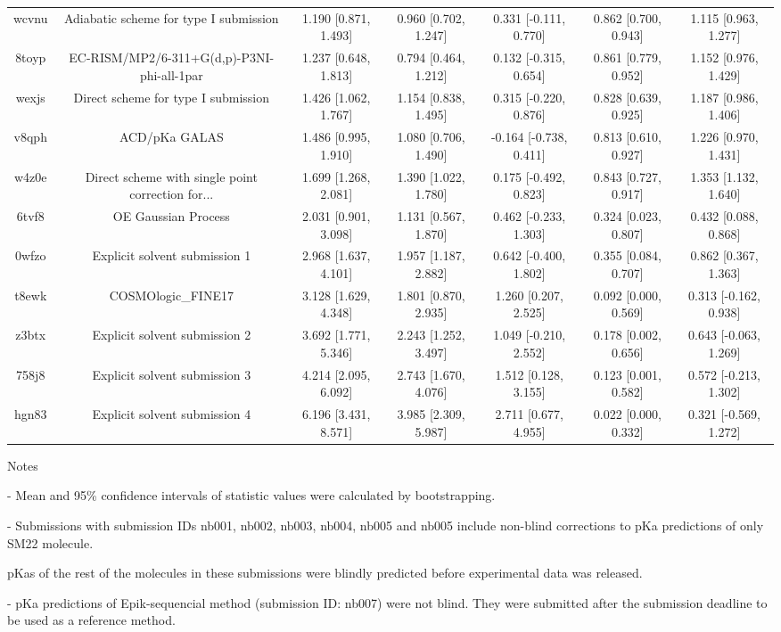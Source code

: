 \documentclass{article}
\begin{document}
\begin{center}
\begin{longtable}{|ccccccc|}
 wcvnu &             Adiabatic scheme for type I submission &  1.190 [0.871, 1.493] &  0.960 [0.702, 1.247] &    0.331 [-0.111, 0.770] &  0.862 [0.700, 0.943] &   1.115 [0.963, 1.277] \\
 8toyp &         EC-RISM/MP2/6-311+G(d,p)-P3NI-phi-all-1par &  1.237 [0.648, 1.813] &  0.794 [0.464, 1.212] &    0.132 [-0.315, 0.654] &  0.861 [0.779, 0.952] &   1.152 [0.976, 1.429] \\
 wexjs &                Direct scheme for type I submission &  1.426 [1.062, 1.767] &  1.154 [0.838, 1.495] &    0.315 [-0.220, 0.876] &  0.828 [0.639, 0.925] &   1.187 [0.986, 1.406] \\
 v8qph &                                      ACD/pKa GALAS &  1.486 [0.995, 1.910] &  1.080 [0.706, 1.490] &   -0.164 [-0.738, 0.411] &  0.813 [0.610, 0.927] &   1.226 [0.970, 1.431] \\
 w4z0e &  Direct scheme with single point correction for... &  1.699 [1.268, 2.081] &  1.390 [1.022, 1.780] &    0.175 [-0.492, 0.823] &  0.843 [0.727, 0.917] &   1.353 [1.132, 1.640] \\
 6tvf8 &                                OE Gaussian Process &  2.031 [0.901, 3.098] &  1.131 [0.567, 1.870] &    0.462 [-0.233, 1.303] &  0.324 [0.023, 0.807] &   0.432 [0.088, 0.868] \\
 0wfzo &                      Explicit solvent submission 1 &  2.968 [1.637, 4.101] &  1.957 [1.187, 2.882] &    0.642 [-0.400, 1.802] &  0.355 [0.084, 0.707] &   0.862 [0.367, 1.363] \\
 t8ewk &                                 COSMOlogic\_FINE17 &  3.128 [1.629, 4.348] &  1.801 [0.870, 2.935] &     1.260 [0.207, 2.525] &  0.092 [0.000, 0.569] &  0.313 [-0.162, 0.938] \\
 z3btx &                      Explicit solvent submission 2 &  3.692 [1.771, 5.346] &  2.243 [1.252, 3.497] &    1.049 [-0.210, 2.552] &  0.178 [0.002, 0.656] &  0.643 [-0.063, 1.269] \\
 758j8 &                      Explicit solvent submission 3 &  4.214 [2.095, 6.092] &  2.743 [1.670, 4.076] &     1.512 [0.128, 3.155] &  0.123 [0.001, 0.582] &  0.572 [-0.213, 1.302] \\
 hgn83 &                      Explicit solvent submission 4 &  6.196 [3.431, 8.571] &  3.985 [2.309, 5.987] &     2.711 [0.677, 4.955] &  0.022 [0.000, 0.332] &  0.321 [-0.569, 1.272] \\
\end{longtable}
\end{center}

Notes

- Mean and 95\% confidence intervals of statistic values were calculated by bootstrapping.

- Submissions with submission IDs nb001, nb002, nb003, nb004, nb005 and nb005 include non-blind corrections to pKa predictions of only SM22 molecule.

pKas of the rest of the molecules in these submissions were blindly predicted before experimental data was released.

- pKa predictions of Epik-sequencial method (submission ID: nb007) were not blind. They were submitted after the submission deadline to be used as a reference method.
\end{document}
